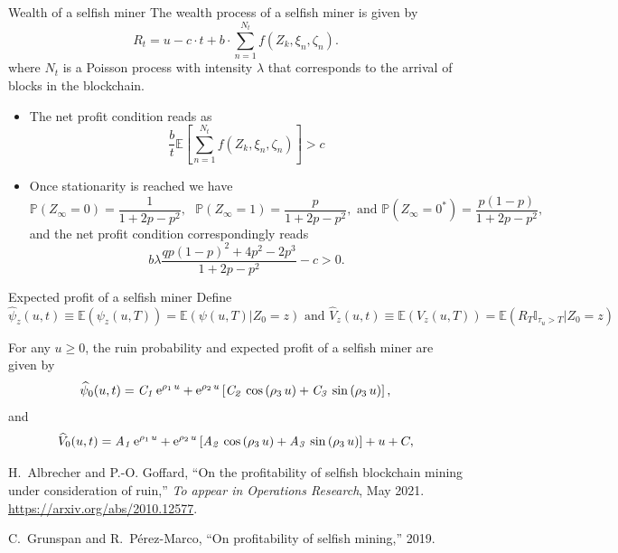 \documentclass{beamer}
\def \E{\mathbb E}
\def \w{\widehat}
\def \P {\mathbb P}
\begin{document}
\begin{frame}{Wealth of a selfish miner}
\scriptsize
The wealth process of a selfish miner is given by 
$$
R_t = u - c\cdot t +b\cdot\sum_{n=1}^{N_t} f(Z_k,\xi_n,\zeta_n ).
$$
where $N_t$ is a Poisson process with intensity $\lambda$ that corresponds to the arrival of blocks in the blockchain.
\begin{itemize}
  \item The net profit condition reads as 
  $$
  \frac{b}{t}\mathbb{E}\left[\sum_{n=1}^{N_t} f(Z_k,\xi_n,\zeta_n )\right] > c
  $$
  \item Once stationarity is reached we have 
  $$
\P(Z_\infty = 0)=\frac{1}{1+2p-p^2},\text{ }\P(Z_\infty = 1)=\frac{p}{1+2p-p^2},\text{ and }\P(Z_\infty = 0^{\ast})=\frac{p(1-p)}{1+2p-p^2},
$$
and the net profit condition correspondingly reads
\begin{equation*}
b\lambda\frac{qp(1-p)^2 + 4p^2-2p^3}{1+2p-p^2} - c>0.
\end{equation*}
\end{itemize}
\end{frame}
\begin{frame}{Expected profit of a selfish miner}
\scriptsize
Define 
\begin{equation*}
\w{\psi}_z(u,t)\equiv \E(\psi_z(u,T)) = \mathbb{E}\left(\psi(u,T)\Big \rvert Z_0 = z\right) \text{ and }\w{V}_z(u,t)\equiv \E(V_z(u,T)) = \mathbb{E}\left(R_T\mathbb{I}_{\tau_u>T}\Big \rvert Z_0 = z\right)
\end{equation*}
\begin{tcolorbox}[enhanced,drop shadow, title=Theorem]
For any $u\ge 0$, the ruin probability and expected profit of a selfish miner are given by
\begin{equation*}\label{ruin_selfish_app}
\w{\psi}_0(u,t) =
{\it C_1}\,{{\rm e}^{\rho_1\,u}}+{{\rm e}^{\rho_2\,u}} \left[ {\it C_2}\,
\cos \left( \rho_3\,u \right) +{\it C_3}\,\sin \left( \rho_3\,u \right)\right],
\end{equation*}
and 
\begin{equation*}
\w{V}_0(u,t)={\it A_1}\,{{\rm e}^{\rho_1\,u}}+{{\rm e}^{\rho_2\,u}} \left[ {\it A_2}\,
\cos \left( \rho_3\,u \right) +{\it A_3}\,\sin \left( \rho_3\,u \right)\right] +u+C,\label{thisone}
\end{equation*}
\end{tcolorbox}
\tiny
  \begin{thebibliography}{1}

H.~Albrecher and P.-O. Goffard, ``{On the profitability of selfish blockchain
  mining under consideration of ruin},'' {\em To appear in Operations
  Research}, May 2021.
\newblock \url{https://arxiv.org/abs/2010.12577}.

C.~Grunspan and R.~Pérez-Marco, ``On profitability of selfish mining,'' 2019.
\end{thebibliography}
\end{frame}
\end{document}
